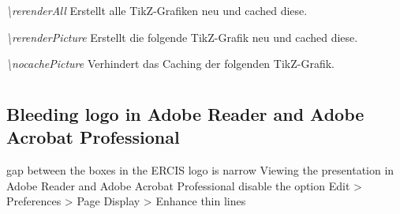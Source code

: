 \documentclass[a4paper,11pt]{article}
\begin{document}
\emph{\textbackslash rerenderAll} Erstellt alle TikZ-Grafiken neu und cached diese.

\emph{\textbackslash rerenderPicture} Erstellt die folgende TikZ-Grafik neu und cached diese.

\emph{\textbackslash nocachePicture} Verhindert das Caching der folgenden TikZ-Grafik.

\providecommand{\rerenderPicture}{%
  \tikzset{external/remake next=true}%
}









\section{}

\subsection{Bleeding logo in Adobe Reader and Adobe Acrobat Professional}

gap between the boxes in the ERCIS logo is narrow
Viewing the presentation in Adobe Reader and Adobe Acrobat Professional
disable the option Edit > Preferences > Page Display > Enhance thin lines
\end{document}
